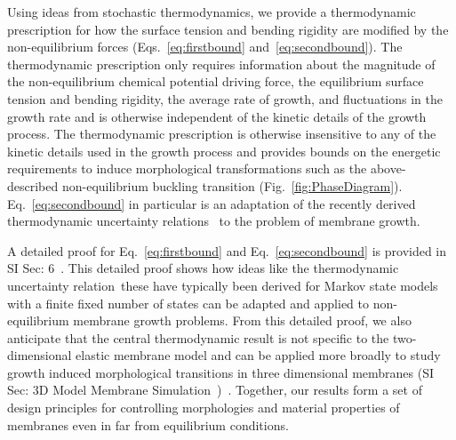 \documentclass[amsmath,preprintnumbers,10pt,nofootinbib,prl,twocolumn]{revtex4-1}
\begin{document}
Using ideas from stochastic thermodynamics, we provide a thermodynamic prescription for how the surface tension and bending rigidity are modified by the non-equilibrium forces (Eqs.~\ref{eq:firstbound} and~\ref{eq:secondbound}). The thermodynamic prescription only requires information about the magnitude of the non-equilibrium chemical potential driving force, the equilibrium surface tension and bending rigidity, the average rate of growth, and fluctuations in the growth rate and is otherwise independent of the kinetic details of the growth process. The thermodynamic prescription is otherwise insensitive to any of the kinetic details used in the growth process and provides bounds on the energetic requirements to induce morphological transformations such as the above-described non-equilibrium buckling transition (Fig.~\ref{fig:PhaseDiagram}). 
Eq.~\ref{eq:secondbound} in particular is an adaptation of the recently derived thermodynamic uncertainty relations~\cite{Gingrich2016} to the problem of membrane growth.

A detailed proof for Eq.~\ref{eq:firstbound} and Eq.~\ref{eq:secondbound} is provided in SI Sec: 6~\cite{Supplementary}. This detailed proof shows how ideas like the thermodynamic uncertainty relation~\cite{Gingrich2016,Barato2015}\textendash these have typically been derived for Markov state models with a finite fixed number of states \textendash can be adapted and applied to non-equilibrium membrane growth problems. From this detailed proof, we also anticipate that the central thermodynamic result is not specific to the two-dimensional elastic membrane model and can be applied more broadly to study growth induced morphological transitions in three dimensional membranes (SI Sec: 3D Model Membrane Simulation~\cite{Supplementary})~\cite{Mahadevan2019}. 
Together, our results form a set of design principles for controlling morphologies and material properties of membranes even in far from equilibrium conditions.

\end{document}
